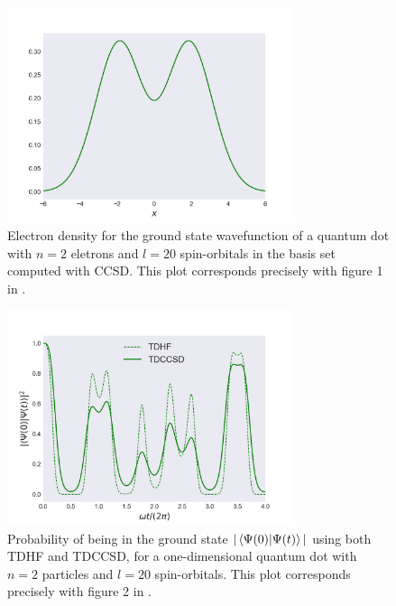 \begin{figure}
    \centering
    \includegraphics[width=0.75\textwidth]{results/figures/zanghellini_fig1.png}
    \caption{
        \label{fig:zanghellini_fig1}
        Electron density for the ground state wavefunction of a quantum dot with 
        $n=2$ eletrons and $l=20$ spin-orbitals in the basis set computed with
        CCSD. This plot 
        corresponds precisely with figure 1 in
        \citeauthor{Zanghellini04}\cite{Zanghellini04}.
    }
\end{figure}

\begin{figure}
    \centering
    \includegraphics[width=0.75\textwidth]{results/figures/zanghellini_fig2.png}
    \caption{
        \label{fig:zanghellini_fig2}
        Probability of being in the ground state $|\braket{\Psi(0)}{\Psi(t)}|$
        using both TDHF and TDCCSD, for a one-dimensional quantum dot with $n=2$
        particles and $l=20$ spin-orbitals. This plot corresponds precisely with 
        figure 2 in \citeauthor{Zanghellini04}\cite{Zanghellini04}.
    }           
\end{figure}

